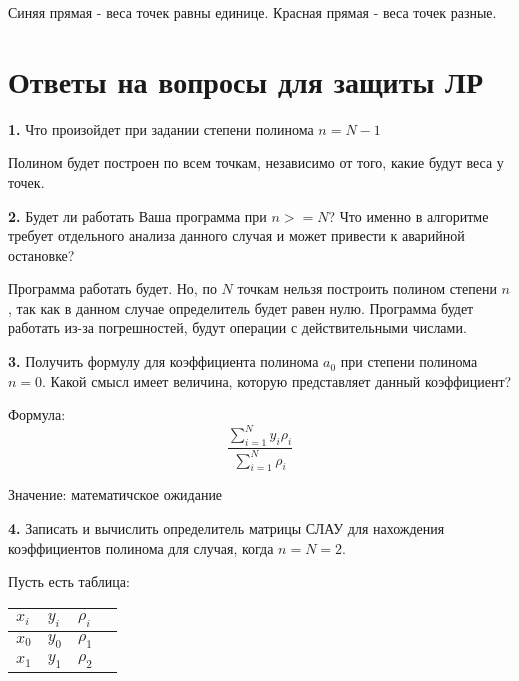 \documentclass[a4paper,12pt]{article}
\begin{document}
\begin{center}
Синяя прямая - веса точек равны единице.\newline
Красная прямая - веса точек разные.\newline
\end{center}

\clearpage
\section{Ответы на вопросы для защиты ЛР}
\noindent\textbf{1.} Что произойдет при задании  степени полинома $n = N-1$\newline

\noindent\textbf{}Полином будет построен по всем точкам, независимо от того, какие будут веса у точек.\newline

\noindent\textbf{2.} Будет ли работать Ваша программа при $ n >= N$? Что именно в алгоритме требует отдельного анализа данного случая и может привести к аварийной остановке?\newline

\noindent\textbf{}Программа работать будет. Но, по $N$ точкам нельзя построить полином степени $n$, так как в данном случае определитель будет равен нулю. Программа будет работать из-за погрешностей, будут операции с действительными числами.\newline

\noindent\textbf{3.} Получить формулу для коэффициента  полинома $a_{0}$  при степени полинома $n = 0$. Какой смысл имеет  величина, которую представляет данный коэффициент?\newline

\noindent\textbf{}Формула:
$$ \frac{\sum_{i=1}^{N}y_{i}\rho_{i}}{\sum_{i=1}^{N} \rho_{i}} $$\newline

\noindent\textbf{}Значение: математичское ожидание\newline

\noindent\textbf{4.} Записать и вычислить определитель матрицы СЛАУ для нахождения коэффициентов полинома для случая, когда  $n=N=2$. \newline

\noindent\textbf{}Пусть есть таблица:

\begin{center}
	\begin{tabular}{ | l | l | l | p{1cm} |}
		\hline
		$x_{i}$ & $y_{i}$ & $\rho_{i}$ \\ \hline
		$x_{0}$ & $y_{0}$ & $\rho_{1}$ \\ \hline
		$x_{1} $& $y_{1}$ & $\rho_{2}$ \\
		\hline
	\end{tabular}
\end{center}
\end{document}
